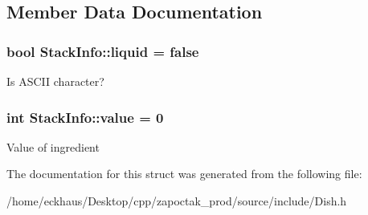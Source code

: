 \subsection{Member Data Documentation}
\hypertarget{structStackInfo_a37ea92877d69ca4e88f5820d4eab787b}{
\subsubsection[{liquid}]{\setlength{\rightskip}{0pt plus 5cm}bool Stack\-Info\-::liquid = false}}\label{structStackInfo_a37ea92877d69ca4e88f5820d4eab787b}
Is A\-S\-C\-I\-I character? \hypertarget{structStackInfo_a14e308ce84edd0276ae34990f7891212}{
\subsubsection[{value}]{\setlength{\rightskip}{0pt plus 5cm}int Stack\-Info\-::value = 0}}\label{structStackInfo_a14e308ce84edd0276ae34990f7891212}
Value of ingredient 

The documentation for this struct was generated from the following file\-:\begin{DoxyCompactItemize}
\item 
/home/eckhaus/\-Desktop/cpp/zapoctak\-\_\-prod/source/include/Dish.\-h\end{DoxyCompactItemize}
